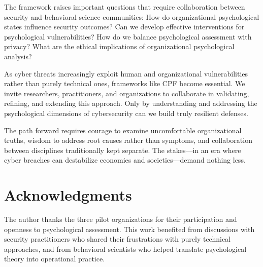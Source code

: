\documentclass[11pt,a4paper]{article}
\begin{document}
The framework raises important questions that require collaboration between security and behavioral science communities: How do organizational psychological states influence security outcomes? Can we develop effective interventions for psychological vulnerabilities? How do we balance psychological assessment with privacy? What are the ethical implications of organizational psychological analysis?

As cyber threats increasingly exploit human and organizational vulnerabilities rather than purely technical ones, frameworks like CPF become essential. We invite researchers, practitioners, and organizations to collaborate in validating, refining, and extending this approach. Only by understanding and addressing the psychological dimensions of cybersecurity can we build truly resilient defenses.

The path forward requires courage to examine uncomfortable organizational truths, wisdom to address root causes rather than symptoms, and collaboration between disciplines traditionally kept separate. The stakes—in an era where cyber breaches can destabilize economies and societies—demand nothing less.

\section*{Acknowledgments}

The author thanks the three pilot organizations for their participation and openness to psychological assessment. This work benefited from discussions with security practitioners who shared their frustrations with purely technical approaches, and from behavioral scientists who helped translate psychological theory into operational practice.
\end{document}
